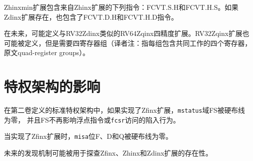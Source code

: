 Zhinxmin扩展包含来自Zhinx扩展的下列指令：FCVT.S.H和FCVT.H.S。如果Zdinx扩展存在，也包含了FCVT.D.H和FCVT.H.D指令。

\begin{commentary}
在未来，可能定义与RV32Zdinx类似的RV64Zqinx四精度扩展。RV32Zqinx扩展也可能被定义，但是需要四寄存器组（译者注：指每组包含共同工作的四个寄存器，原文quad-register groups）。
\end{commentary}

\section{特权架构的影响}

在第二卷定义的标准特权架构中，如果实现了Zfinx扩展，{\tt mstatus}域FS被硬布线为零，
并且FS不再影响浮点指令或{\tt fcsr}访问的陷入行为。

当实现了Zfinx扩展时，{\tt misa}位F、D和Q被硬布线为零。

\begin{commentary}
    未来的发现机制可能被用于探查Zfinx、Zhinx和Zdinx扩展的存在性。
\end{commentary}
